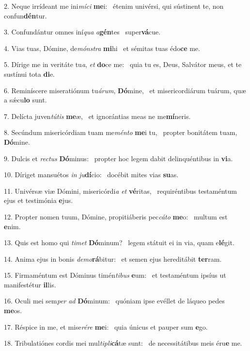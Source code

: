 2. Neque irrídeant me ini\textit{mí}\textit{ci} \textbf{me}i: \ast\  étenim univérsi, qui sústinent te, non confun\textbf{dén}tur.\

3. Confundántur omnes iní\textit{qua} \textit{a}\textbf{gén}tes \ast\  super\textbf{vá}cue.\

4. Vias tuas, Dómine, de\textit{móns}\textit{tra} \textbf{mi}hi \ast\  et sémitas tuas édo\textbf{ce} me.\

5. Dírige me in veritáte tu\textit{a}, \textit{et} \textbf{do}ce me: \ast\  quia tu es, Deus, Salvátor meus, et te sustínui tota \textbf{di}e.\

6. Reminíscere miseratiónum tu\textit{á}\textit{rum}, \textbf{Dó}mine, \ast\  et misericordiárum tuárum, quæ a sǽcu\textbf{lo} sunt.\

7. Delícta juven\textit{tú}\textit{tis} \textbf{me}æ, \ast\  et ignorántias meas ne me\textbf{mí}neris.\

8. Secúndum misericórdiam tuam me\textit{mén}\textit{to} \textbf{me}i tu, \ast\  propter bonitátem tuam, \textbf{Dó}mine.\

9. Dulcis et \textit{rec}\textit{tus} \textbf{Dó}minus: \ast\  propter hoc legem dabit delinquéntibus in \textbf{vi}a.\

10. Díriget mansuétos \textit{in} \textit{ju}\textbf{dí}cio: \ast\  docébit mites vias \textbf{su}as.\

11. Univérsæ viæ Dómini, misericórdi\textit{a} \textit{et} \textbf{vé}ritas, \ast\  requiréntibus testaméntum ejus et testimónia \textbf{e}jus.\

12. Propter nomen tuum, Dómine, propitiáberis pec\textit{cá}\textit{to} \textbf{me}o: \ast\  multum est \textbf{e}nim.\

13. Quis est homo qui \textit{ti}\textit{met} \textbf{Dó}minum? \ast\  legem státuit ei in via, quam e\textbf{lé}git.\

14. Anima ejus in bonis \textit{de}\textit{mo}\textbf{rá}bitur: \ast\  et semen ejus hereditábit \textbf{ter}ram.\

15. Firmaméntum est Dóminus timén\textit{ti}\textit{bus} \textbf{e}um: \ast\  et testaméntum ipsíus ut manifestétur \textbf{il}lis.\

16. Oculi mei sem\textit{per} \textit{ad} \textbf{Dó}minum: \ast\  quóniam ipse evéllet de láqueo pedes \textbf{me}os.\

17. Réspice in me, et mise\textit{ré}\textit{re} \textbf{me}i: \ast\  quia únicus et pauper sum \textbf{e}go.\

18. Tribulatiónes cordis mei mul\textit{ti}\textit{pli}\textbf{cá}tæ sunt: \ast\  de necessitátibus meis éru\textbf{e} me.\

